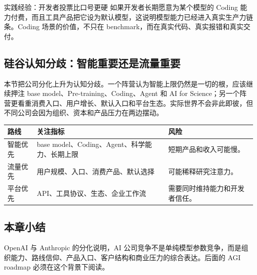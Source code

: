 \begin{importantbox}{实践经验：开发者投票比口号更硬}
如果开发者长期愿意为某个模型的 Coding 能力付费，而且工具产品把它设为默认模型，这说明模型能力已经进入真实生产力链条。Coding 场景的价值，不只在 benchmark，而在真实代码、真实报错和真实交付。
\end{importantbox}

\subsection{硅谷认知分歧：智能重要还是流量重要}

本节把公司分化上升为认知分歧。一个阵营认为智能上限仍然是一切的根，应该继续押注 base model、Pre-training、Coding、Agent 和 AI for Science；另一个阵营更看重消费入口、用户增长、默认入口和平台生态。实际世界不会非此即彼，但不同公司会因为组织、资本和产品压力在两边摆动。

\noindent\begin{tabularx}{\textwidth}{p{}p{}X}
\toprule
路线 & 关注指标 & 风险 \\
\midrule
智能优先 & base model、Coding、Agent、科学能力、长期上限 & 短期产品和收入可能慢。 \\
流量优先 & 用户规模、入口、消费产品、默认选择 & 可能稀释研究注意力。 \\
平台优先 & API、工具协议、生态、企业工作流 & 需要同时维持能力和开发者信任。 \\
\bottomrule
\end{tabularx}

\subsection{本章小结}

OpenAI 与 Anthropic 的分化说明，AI 公司竞争不是单纯模型参数竞争，而是组织能力、路线信仰、产品入口、客户结构和商业压力的综合表达。后面的 AGI roadmap 必须在这个背景下阅读。

